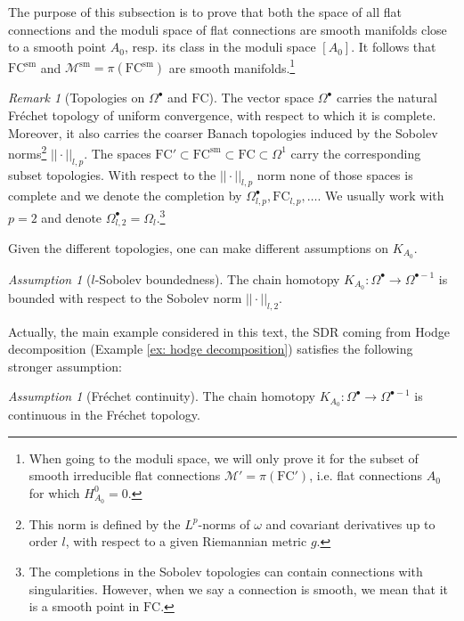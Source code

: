 \documentclass[11pt,a4paper]{amsart}
\theoremstyle{plain} %
\theoremstyle{definition}
\theoremstyle{remark}
\newtheorem{rem}[thm]{Remark}
\newtheorem{ass}[thm]{Assumption}
\newcommand{\mr}{\mathrm}
\newcommand{\M}{\mathcal{M}}
\newcommand{\FC}{\mathrm{FC}}
\begin{document}
The purpose of this subsection is to prove that both the space of all flat connections and the moduli space of flat connections are smooth manifolds close to a smooth point $A_0$, resp. its class in the moduli space $[A_0]$. It follows that $\FC^\mr{sm}$ and $\M^\mr{sm} = \pi(\FC^\mr{sm})$ are smooth manifolds.\footnote{When going to the moduli space, we will only prove it for the subset of smooth irreducible flat connections $\M' = \pi(\FC')$, i.e. flat connections $A_0$ for which $H^0_{A_0}=0.$} 
\begin{rem}[Topologies on $\Omega^\bullet$ and $\FC$]
The vector space $\Omega^\bullet$ carries the natural Fr\'echet topology of uniform convergence, with respect to which it is complete. Moreover, it also carries the coarser Banach topologies induced by the Sobolev norms\footnote{This norm is defined by the $L^p$-norms of $\omega$ and covariant derivatives up to order $l$, with respect to a given Riemannian metric $g$.} $ ||\cdot||_{l,p}$. The spaces $\FC' \subset \FC^\mr{sm} \subset \FC \subset \Omega^1$ carry the corresponding subset topologies. With respect to the $||\cdot||_{l,p}$ norm none of those spaces is complete and we denote the completion by $\Omega^\bullet_{l,p}, \FC_{l,p},\ldots$. We usually work with $p=2$ and denote $\Omega^\bullet_{l,2} = \Omega_{l}$.\footnote{The completions in the Sobolev topologies can contain connections with singularities. However, when we say a connection is smooth, we mean that it is a smooth point in $\FC$.} 
\end{rem}
Given the different topologies, one can make different assumptions on $K_{A_0}$. 
\begin{ass}[$l$-Sobolev boundedness]\label{ass: Banach} 
    The chain homotopy $K_{A_0}\colon \Omega^\bullet \to \Omega^{\bullet-1}$ is bounded with respect to the Sobolev norm $||\cdot||_{l,2}$.
\end{ass} 
Actually, the main example considered in this text, the SDR coming from Hodge decomposition (Example \ref{ex: hodge decomposition}) satisfies the following stronger assumption: 
\begin{ass}[Fr\'echet continuity]\label{ass: Frechet}
The chain homotopy $K_{A_0} \colon \Omega^\bullet \to \Omega^{\bullet -1}$ is continuous in the Fr\'echet topology. 
\end{ass}
\end{document}
